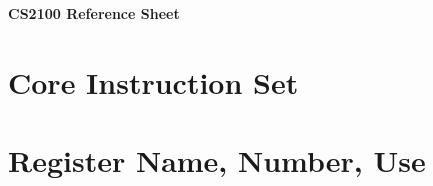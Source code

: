 \documentclass[11pt]{article}
\begin{document}
\pagestyle{empty}

\textbf{\Huge CS2100 Reference Sheet}

\vspace{1em}

\begin{minipage}[t]{0.68\linewidth}
	\section*{Core Instruction Set}
	
\end{minipage}
\hfill
\begin{minipage}[t]{0.3\linewidth}
	\section*{Register Name, Number, Use}
	

	
\end{minipage}



\vfill
\end{document}
